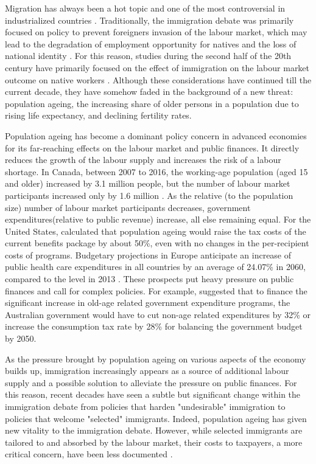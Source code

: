 Migration has always been a hot topic and one of the most controversial in industrialized countries \citep{Marois:2020je}.
Traditionally, the immigration debate was primarily focused on policy to prevent foreigners invasion of the labour market, which may lead to the degradation of employment opportunity for natives \citep{Fusaro:2018wi} and the loss of national identity \citep{Castles:2012vr}.
For this reason, studies during the second half of the 20th century have primarily focused on the effect of immigration on the labour market outcome on native workers \citep{Piche:2013ir}.
Although these considerations have continued till the current decade, they have somehow faded in the background of a new threat: population ageing, the increasing share of older persons in a population due to rising life expectancy, and declining fertility rates.

\vspace{0.7em}\par
Population ageing has become a dominant policy concern in advanced economies for its far-reaching effects on the labour market and public finances.
It directly reduces the growth of the labour supply and increases the risk of a labour shortage.
In Canada, between 2007 to 2016, the working-age population (aged 15 and older) increased by 3.1 million people, but the number of labour market participants increased only by 1.6 million \citep{Fields:2017wa}.
As the relative (to the population size) number of labour market participants decreases, government expenditures(relative to public revenue) increase, all else remaining equal.
For the United States, \citet{Lee:bKjc_XK_} calculated that population ageing would raise the tax costs of the current benefits package by about 50\%, even with no changes in the per-recipient costs of programs.
Budgetary projections in Europe anticipate an increase of public health care expenditures in all countries by an average of 24.07\% in 2060, compared to the level in 2013 \citep{Zokalj:2016bq}.
These prospects put heavy pressure on public finances and call for complex policies.
For example, \citet{Kudrna:2015dr} suggested that to finance the significant increase in old-age related government expenditure programs, the Australian government would have to cut non-age related expenditures by 32\% or increase the consumption tax rate by 28\% for balancing the government budget by 2050.

\vspace{0.7em}\par
As the pressure brought by population ageing on various aspects of the economy builds up, immigration increasingly appears as a source of additional labour supply and a possible solution to alleviate the pressure on public finances.
For this reason, recent decades have seen a subtle but significant change within the immigration debate from policies that harden "undesirable" immigration to policies that welcome "selected" immigrants.
Indeed, population ageing has given new vitality to the immigration debate. However, while selected immigrants are tailored to and absorbed by the labour market, their costs to taxpayers, a more critical concern, have been less documented \citep{Dustmann:2007fl}.

